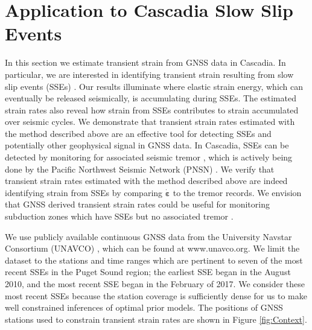 \documentclass[10pt,a4paper]{article}
\begin{document}
\section{Application to Cascadia Slow Slip Events}\label{sec:Cascadia}
In this section we estimate transient strain from GNSS data in Cascadia. In particular, we are interested in identifying transient strain resulting from slow slip events (SSEs) \citep[e.g.,][]{Dragert2001}. Our results illuminate where elastic strain energy, which can eventually be released seismically, is accumulating during SSEs. The estimated strain rates also reveal how strain from SSEs contributes to strain accumulated over seismic cycles. We demonstrate that transient strain rates estimated with the method described above are an effective tool for detecting SSEs and potentially other geophysical signal in GNSS data.  In Cascadia, SSEs can be detected by monitoring for associated seismic tremor \citep{Rogers2003}, which is actively being done by the Pacific Northwest Seismic Network (PNSN) \citep{Wech2010}. We verify that transient strain rates estimated with the method described above are indeed identifying strain from SSEs by comparing $\dot{\bm{\varepsilon}}$ to the tremor records.  We envision that GNSS derived transient strain rates could be useful for monitoring subduction zones which have SSEs but no associated tremor \citep{Schwartz2007}.

We use publicly available continuous GNSS data from the University Navstar Consortium (UNAVCO) \citep{Herring2016}, which can be found at www.unavco.org. We limit the dataset to the stations and time ranges which are pertinent to seven of the most recent SSEs in the Puget Sound region; the earliest SSE began in the August 2010, and the most recent SSE began in the February of 2017. We consider these most recent SSEs because the station coverage is sufficiently dense for us to make well constrained inferences of optimal prior models.  The positions of GNSS stations used to constrain transient strain rates are shown in Figure \ref{fig:Context}.  
\end{document}
